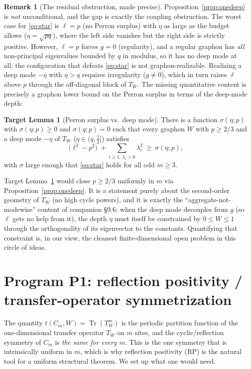 \documentclass[11pt]{article}
\theoremstyle{definition}
\newtheorem{remark}[theorem]{Remark}
\newtheorem{target}[theorem]{Target Lemma}
\newcommand{\Tr}{\operatorname{Tr}}
\newcommand{\1}{\mathbf{1}}
\begin{document}
\begin{remark}[The residual obstruction, made precise]\label{rem:obstruction}
Proposition~\ref{prop:onedeep} is \emph{not} unconditional, and the gap is
exactly the coupling obstruction. The worst case for \eqref{eq:star} is
$\ell=p$ (no Perron surplus) with $\eta$ as large as the budget allows
($\eta=\sqrt{pq}$), where the left side vanishes but the right side is strictly
positive. However, $\ell=p$ forces $g=0$ (regularity), and a regular graphon has
\emph{all} non-principal eigenvalues bounded by $q$ in modulus, so it has no deep
mode at all: the configuration that defeats \eqref{eq:star} is not
graphon-realizable. Realizing a deep mode $-\eta$ with $\eta>q$ requires
irregularity ($g\ne0$), which in turn raises $\ell$ above $p$ through the
off-diagonal block of $T_W$. The missing quantitative content is precisely a
graphon lower bound on the Perron surplus in terms of the deep-mode depth:
\end{remark}

\begin{target}[Perron surplus vs.\ deep mode]\label{tgt:surplus}
There is a function $\sigma(\eta;p)$ with $\sigma(\eta;p)\ge 0$ and
$\sigma(q;p)=0$ such that every graphon $W$ with $p\ge 2/3$ and a deep mode
$-\eta$ of $T_W$ ($\eta\in(q,\tfrac12]$) satisfies
\[
\bigl(\ell^2-p^2\bigr)\;+\!\!\sum_{i\ge1,\,\lambda_i>0}\!\!\lambda_i^2
\ \ge\ \sigma(\eta;p),
\]
with $\sigma$ large enough that \eqref{eq:star} holds for all odd $m\ge3$.
\end{target}

Target Lemma~\ref{tgt:surplus} would close $p\ge 2/3$ uniformly in $m$ via
Proposition~\ref{prop:onedeep}. It is a statement purely about the second-order
geometry of $T_W$ (no high cycle powers), and it is exactly the
``aggregate-not-modewise'' content of companion \S9.6: when the deep mode
decouples from $g$ (so $\ell$ gets no help from it), the depth $\eta$ must itself
be constrained by $0\le W\le1$ through the orthogonality of its eigenvector to
the constants. Quantifying that constraint is, in our view, the cleanest
finite-dimensional open problem in this circle of ideas.

\section{Program P1: reflection positivity / transfer-operator symmetrization}
\label{sec:rp}

The quantity $t(C_m,W)=\Tr(T_W^m)$ is the periodic partition function of the
one-dimensional transfer operator $T_W$ on $m$ sites, and the cyclic/reflection
symmetry of $C_m$ is \emph{the same for every $m$}. This is the one symmetry that
is intrinsically uniform in $m$, which is why reflection positivity (RP) is the
natural tool for a uniform structural theorem. We set up what one would need.
\end{document}
